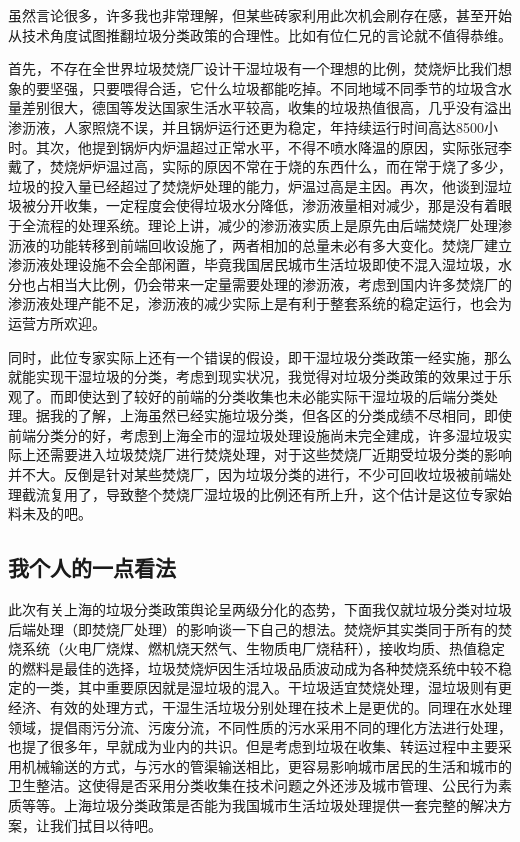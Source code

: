 \documentclass[]{book}
\begin{document}
虽然言论很多，许多我也非常理解，但某些砖家利用此次机会刷存在感，甚至开始从技术角度试图推翻垃圾分类政策的合理性。比如有位仁兄的言论就不值得恭维。

首先，不存在全世界垃圾焚烧厂设计干湿垃圾有一个理想的比例，焚烧炉比我们想象的要坚强，只要喂得合适，它什么垃圾都能吃掉。不同地域不同季节的垃圾含水量差别很大，德国等发达国家生活水平较高，收集的垃圾热值很高，几乎没有溢出渗沥液，人家照烧不误，并且锅炉运行还更为稳定，年持续运行时间高达8500小时。其次，他提到锅炉内炉温超过正常水平，不得不喷水降温的原因，实际张冠李戴了，焚烧炉炉温过高，实际的原因不常在于烧的东西什么，而在常于烧了多少，垃圾的投入量已经超过了焚烧炉处理的能力，炉温过高是主因。再次，他谈到湿垃圾被分开收集，一定程度会使得垃圾水分降低，渗沥液量相对减少，那是没有着眼于全流程的处理系统。理论上讲，减少的渗沥液实质上是原先由后端焚烧厂处理渗沥液的功能转移到前端回收设施了，两者相加的总量未必有多大变化。焚烧厂建立渗沥液处理设施不会全部闲置，毕竟我国居民城市生活垃圾即使不混入湿垃圾，水分也占相当大比例，仍会带来一定量需要处理的渗沥液，考虑到国内许多焚烧厂的渗沥液处理产能不足，渗沥液的减少实际上是有利于整套系统的稳定运行，也会为运营方所欢迎。

同时，此位专家实际上还有一个错误的假设，即干湿垃圾分类政策一经实施，那么就能实现干湿垃圾的分类，考虑到现实状况，我觉得对垃圾分类政策的效果过于乐观了。而即使达到了较好的前端的分类收集也未必能实际干湿垃圾的后端分类处理。据我的了解，上海虽然已经实施垃圾分类，但各区的分类成绩不尽相同，即使前端分类分的好，考虑到上海全市的湿垃圾处理设施尚未完全建成，许多湿垃圾实际上还需要进入垃圾焚烧厂进行焚烧处理，对于这些焚烧厂近期受垃圾分类的影响并不大。反倒是针对某些焚烧厂，因为垃圾分类的进行，不少可回收垃圾被前端处理截流复用了，导致整个焚烧厂湿垃圾的比例还有所上升，这个估计是这位专家始料未及的吧。

\hypertarget{ux6211ux4e2aux4ebaux7684ux4e00ux70b9ux770bux6cd5}{%
\subsection{我个人的一点看法}\label{ux6211ux4e2aux4ebaux7684ux4e00ux70b9ux770bux6cd5}}

此次有关上海的垃圾分类政策舆论呈两级分化的态势，下面我仅就垃圾分类对垃圾后端处理（即焚烧厂处理）的影响谈一下自己的想法。焚烧炉其实类同于所有的焚烧系统（火电厂烧煤、燃机烧天然气、生物质电厂烧秸秆），接收均质、热值稳定的燃料是最佳的选择，垃圾焚烧炉因生活垃圾品质波动成为各种焚烧系统中较不稳定的一类，其中重要原因就是湿垃圾的混入。干垃圾适宜焚烧处理，湿垃圾则有更经济、有效的处理方式，干湿生活垃圾分别处理在技术上是更优的。同理在水处理领域，提倡雨污分流、污废分流，不同性质的污水采用不同的理化方法进行处理，也提了很多年，早就成为业内的共识。但是考虑到垃圾在收集、转运过程中主要采用机械输送的方式，与污水的管渠输送相比，更容易影响城市居民的生活和城市的卫生整洁。这使得是否采用分类收集在技术问题之外还涉及城市管理、公民行为素质等等。上海垃圾分类政策是否能为我国城市生活垃圾处理提供一套完整的解决方案，让我们拭目以待吧。
\end{document}

